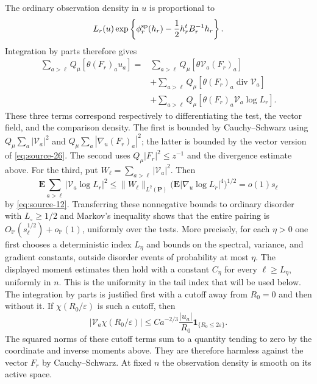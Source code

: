 The ordinary observation density in $u$ is proportional to
\[
 L_r(u)\exp\left\{\phi_r^{\rm sp}(h_r)
                         -\frac12h_r^tB_r^{-1}h_r\right\}.
\]
Integration by parts therefore gives
\[
 \begin{split}
 \sum_{a>\ell}Q_\mu[\theta(F_r)_a u_a]
 ={}&\sum_{a>\ell}Q_\mu[\theta\mathcal V_a(F_r)_a]\\
 &+\sum_{a>\ell}Q_\mu[\theta(F_r)_a\operatorname{div}\mathcal V_a]\\
 &+\sum_{a>\ell}Q_\mu[\theta(F_r)_a\mathcal V_a\log L_r].
 \end{split}
\]
These three terms correspond respectively to differentiating the test,
the vector field, and the comparison density.  The first is bounded by
Cauchy--Schwarz using
$Q_\mu\sum_a|\mathcal V_a|^2$ and
$Q_\mu\sum_a|\nabla_u(F_r)_a|^2$; the latter is bounded by the vector
version of \eqref{eq:source-26}.  The second uses
$Q_\mu|F_r|^2\leq z^{-1}$ and the divergence estimate above.
For the third, put $W_\ell=\sum_{a>\ell}|\mathcal V_a|^2$.  Then
\[
 \mathbf E\sum_{a>\ell}|\mathcal V_a\log L_r|^2
 \leq \|W_\ell\|_{L^2(\mathbf P)}
       \big(\mathbf E|\nabla_u\log L_r|^4\big)^{1/2}
 =o(1)s_\ell
\]
by \eqref{eq:source-12}.  Transferring these nonnegative bounds to
ordinary disorder with $L_\circ\geq1/2$ and Markov's inequality shows
that the entire pairing is
$O_{\mathbb P}(s_\ell^{1/2})+o_{\mathbb P}(1)$, uniformly over the tests.
More precisely, for each $\eta>0$ one first chooses a deterministic
index $L_\eta$ and bounds on the spectral, variance, and gradient
constants, outside disorder events of probability at most $\eta$.
The displayed moment estimates then hold with a constant $C_\eta$
for every $\ell\geq L_\eta$, uniformly in $n$.  This is the uniformity
in the tail index that will be used below.
The integration by parts is justified first with a cutoff away from
$R_0=0$ and then without it.  If $\chi(R_0/\varepsilon)$ is such a
cutoff, then
\[
 |\mathcal V_a\chi(R_0/\varepsilon)|
 \leq Ca^{-2/3}\frac{|u_a|}{R_0}
             \mathbf1_{\{R_0\leq2\varepsilon\}}.
\]
The squared norms of these cutoff terms sum to a quantity tending to
zero by the coordinate and inverse moments above.  They are therefore
harmless against the vector $F_r$ by Cauchy--Schwarz.  At fixed
$n$ the observation density is smooth on its active space.

